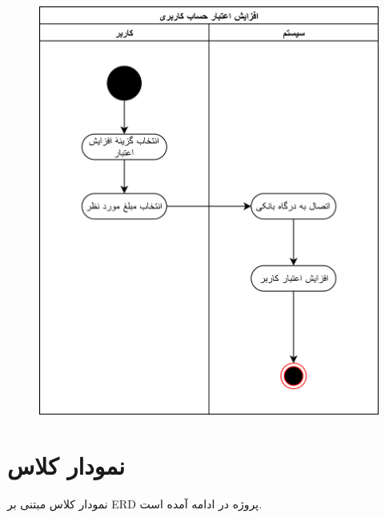 \documentclass{article}
\begin{document}
\begin{figure}[htp]
\includegraphics[width = 1\textwidth]{../Activity Diagrams/Activity 5.png}
\caption{}
\label{activity4}
\end{figure}

\newpage

\section{نمودار کلاس}

نمودار کلاس مبتنی بر ERD پروژه در ادامه آمده است.
\end{document}
